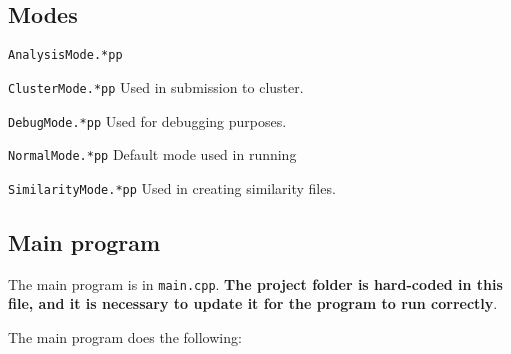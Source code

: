 \documentclass[]{article}
\begin{document}
\subsection{Modes}
\item \texttt{AnalysisMode.*pp}

\item \texttt{ClusterMode.*pp} Used in submission to cluster.

\item \texttt{DebugMode.*pp} Used for debugging purposes.

\item \texttt{NormalMode.*pp} Default mode used in running

\item \texttt{SimilarityMode.*pp} Used in creating similarity files.

\subsection{Main program}

The main program is in \texttt{main.cpp}. \textbf{The project folder is hard-coded in this file, and it is necessary to update it for the program to run correctly}.

The main program does the following:
\end{document}
